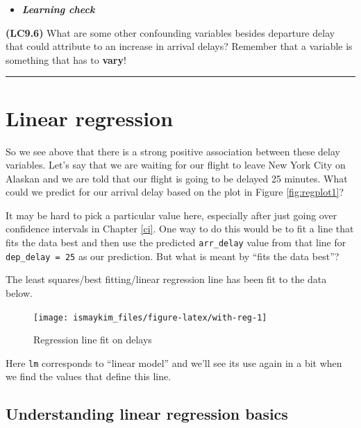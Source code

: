 \documentclass[]{tufte-book}
\let\oldrule=\rule
\renewcommand{\rule}[1]{\oldrule{\linewidth}}
\newenvironment{rmdblock}[1]
  {\begin{shaded*}
  \begin{itemize}
  \renewcommand{\labelitemi}{
    \raisebox{-.7\height}[0pt][0pt]{
    }
  }
  \item
  }
  {
  \end{itemize}
  \end{shaded*}
  }
\newenvironment{learncheck}
  {\begin{rmdblock}{warning}}
  {\end{rmdblock}}
\theoremstyle{definition}
\theoremstyle{definition}
\theoremstyle{remark}
\begin{document}
\begin{learncheck}
\textbf{\emph{Learning check}}
\end{learncheck}

\textbf{(LC9.6)} What are some other confounding variables besides
departure delay that could attribute to an increase in arrival delays?
Remember that a variable is something that has to \textbf{vary}!

\begin{center}\rule{0.5\linewidth}{\linethickness}\end{center}

\section{Linear regression}\label{linear-regression}

So we see above that there is a strong positive association between
these delay variables. Let's say that we are waiting for our flight to
leave New York City on Alaskan and we are told that our flight is going
to be delayed 25 minutes. What could we predict for our arrival delay
based on the plot in Figure \ref{fig:regplot1}?

It may be hard to pick a particular value here, especially after just
going over confidence intervals in Chapter \ref{ci}. One way to do this
would be to fit a line that fits the data best and then use the
predicted \texttt{arr\_delay} value from that line for
\texttt{dep\_delay\ =\ 25} as our prediction. But what is meant by
``fits the data best''?

The least squares/best fitting/linear regression line has been fit to
the data below.

\begin{figure}

{\centering \texttt{[image: ismaykim\_files/figure-latex/with-reg-1]} 

}

\caption[Regression line fit on delays]{Regression line fit on delays}\label{fig:with-reg}
\end{figure}

Here \texttt{lm} corresponds to ``linear model'' and we'll see its use
again in a bit when we find the values that define this line.

\subsection{Understanding linear regression
basics}\label{understanding-linear-regression-basics}
\end{document}
